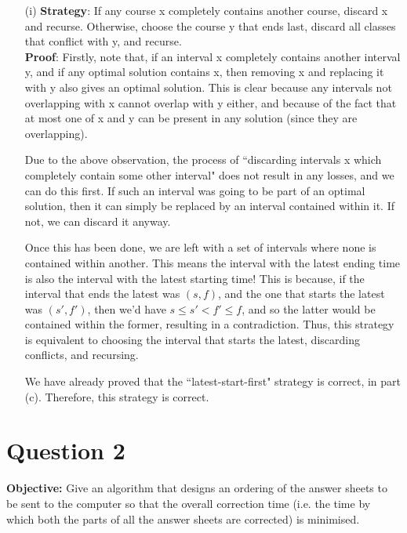 \documentclass[11pt, fleqn]{article}
\begin{document}
\begin{itemize}
    \item[(i)]
    \textbf{Strategy}: If any course x completely contains another course, discard x and recurse. Otherwise, choose the course y that ends last, discard all classes that conflict with y, and recurse.\\
    \textbf{Proof}: Firstly, note that, if an interval x completely contains another interval y, and if any optimal solution contains x, then removing x and replacing it with y also gives an optimal solution. This is clear because any intervals not overlapping with x cannot overlap with y either, and because of the fact that at most one of x and y can be present in any solution (since they are overlapping).
    
    \medskip
    
    Due to the above observation, the process of ``discarding intervals x which completely contain some other interval" does not result in any losses, and we can do this first. If such an interval was going to be part of an optimal solution, then it can simply be replaced by an interval contained within it. If not, we can discard it anyway.
    
    \medskip
    
    Once this has been done, we are left with a set of intervals where none is contained within another. This means the interval with the latest ending time is also the interval with the latest starting time! This is because, if the interval that ends the latest was $(s, f)$, and the one that starts the latest was $(s', f')$, then we'd have $s \leq s' < f' \leq f$, and so the latter would be contained within the former, resulting in a contradiction. Thus, this strategy is equivalent to choosing the interval that starts the latest, discarding conflicts, and recursing.
    
    \medskip
    
    We have already proved that the ``latest-start-first" strategy is correct, in part (c). Therefore, this strategy is correct.
\end{itemize}

\newpage 
\section*{Question 2}
\label{q2}
\setcounter{equation}{0}

\textbf{Objective:} Give an algorithm that designs an ordering of the answer sheets to be sent to the computer so
that the overall correction time (i.e. the time by which both the parts of all the answer sheets
are corrected) is minimised.
\end{document}
